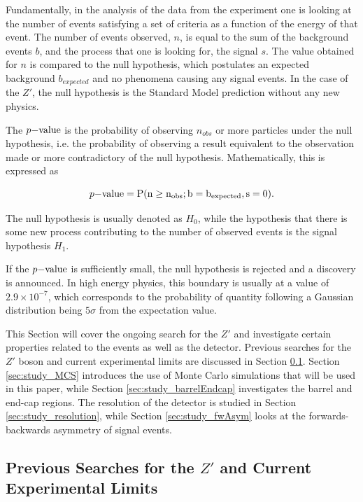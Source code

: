 \documentclass{article}
\begin{document}
Fundamentally, in the analysis of the data from the experiment one is looking at the number of events satisfying a set of criteria as a function of the energy of that event. The number of events observed, $n$, is equal to the sum of the background events $b$, and the process that one is looking for, the signal $s$. The value obtained for $n$ is compared to the null hypothesis, which postulates an expected background $b_{expected}$ and no phenomena causing any signal events. In the case of the $Z'$, the null hypothesis is the Standard Model prediction without any new physics.

The $p\rm{-value}$ is the probability of observing $n_{obs}$ or more particles under the null hypothesis, i.e. the probability of observing a result equivalent to the observation made or more contradictory of the null hypothesis. Mathematically, this is expressed as

\begin{equation}
p\rm{-value} = P(n	\geq n_{obs}; b = b_{expected}, s=0).
\end{equation}

The null hypothesis is usually denoted as $H_0$, while the hypothesis that there is some new process contributing to the number of observed events is the signal hypothesis $H_1$.

If the $p\rm{-value}$ is sufficiently small, the null hypothesis is rejected and a discovery is announced. In high energy physics, this boundary is usually at a value of $2.9\times10^{-7}$, which corresponds to the probability of quantity following a Gaussian distribution being $5\sigma$ from the expectation value.

This Section will cover the ongoing search for the $Z'$ and investigate certain properties related to the events as well as the detector.
Previous searches for the $Z'$ boson and current experimental limits are discussed in Section \ref{sec:study_previousLimits}. Section \ref{sec:study_MCS} introduces the use of Monte Carlo simulations that will be used in this paper, while Section \ref{sec:study_barrelEndcap} investigates the barrel and end-cap regions. The resolution of the detector is studied in Section \ref{sec:study_resolution}, while Section \ref{sec:study_fwAsym} looks at the forwards-backwards asymmetry of signal events.

\subsection{Previous Searches for the $Z'$ and Current Experimental Limits}%
\label{sec:study_previousLimits}
\end{document}
